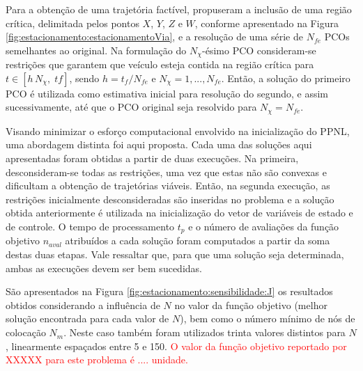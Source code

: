
Para a obtenção de uma trajetória factível,  propuseram a inclusão de uma região crítica, delimitada pelos pontos $ X $, $ Y $, $ Z $ e $ W $, conforme apresentado na Figura \ref{fig:estacionamento:estacionamentoVia}, e a resolução de uma série de $ N_{fe} $ PCOs semelhantes ao original. Na formulação do $ N_\chi $-ésimo PCO consideram-se restrições que garantem que veículo esteja contida na região crítica para $ t \in [h \, N_\chi, \; tf] $, sendo $ h = t_f/N_{fe} $ e $ N_\chi = 1, ..., N_{fe} $. Então, a solução do primeiro PCO é utilizada como estimativa inicial para resolução do segundo, e assim sucessivamente, até que o PCO original seja resolvido para $ N_\chi = N_{fe} $. 

Visando minimizar o esforço computacional envolvido na inicialização do PPNL, uma abordagem distinta foi aqui proposta. Cada uma das soluções aqui apresentadas foram obtidas a partir de duas execuções. Na primeira, desconsideram-se todas as restrições, uma vez que estas não são convexas e dificultam a obtenção de trajetórias viáveis. Então, na segunda execução, as restrições inicialmente desconsideradas são inseridas no problema e a solução obtida anteriormente é utilizada na inicialização do vetor de variáveis de estado e de controle. O tempo de processamento $ t_p $ e o número de avaliações da função objetivo $ n_{aval} $ atribuídos a cada solução foram computados a partir da soma destas duas etapas. Vale ressaltar que, para que uma solução seja determinada, ambas as execuções devem ser bem sucedidas.


São apresentados na Figura \ref{fig:estacionamento:sensibilidade:J} os resultados obtidos considerando a influência de $N$ no valor da função objetivo (melhor solução encontrada para cada valor de $N$), bem como o número mínimo de nós de colocação $ N_m $. Neste caso também foram utilizados trinta valores distintos para $N$, linearmente espaçados entre 5 e 150. \textcolor{red}{O valor da função objetivo reportado por XXXXX para este problema é .... unidade.}

